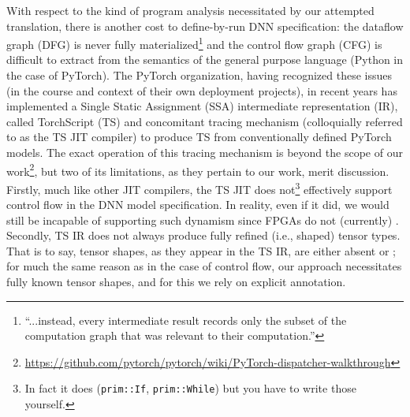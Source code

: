 With respect to the kind of program analysis necessitated by our attempted translation, there is another cost to define-by-run DNN specification: the dataflow graph (DFG) is never fully materialized\footnote{``...instead, every intermediate result records only the subset of the computation graph that was relevant to their computation.''\cite{paszke2017automatic}} and the control flow graph (CFG) is difficult to extract from the semantics of the general purpose language (Python in the case of PyTorch).
The PyTorch organization, having recognized these issues (in the course and context of their own deployment projects), in recent years has implemented a Single Static Assignment (SSA) intermediate representation (IR), called TorchScript (TS) and concomitant tracing mechanism (colloquially referred to as the TS JIT compiler) to produce TS from conventionally defined PyTorch models.
The exact operation of this tracing mechanism is beyond the scope of our work\footnote{\url{https://github.com/pytorch/pytorch/wiki/PyTorch-dispatcher-walkthrough}}, but two of its limitations, as they pertain to our work, merit discussion.
Firstly, much like other JIT compilers, the TS JIT does not\footnote{In fact it does (\texttt{prim::If}, \texttt{prim::While}) but you have to write those yourself.} effectively support control flow in the DNN model specification.
In reality, even if it did, we would still be incapable of supporting such dynamism since FPGAs do not (currently) .
Secondly, TS IR does not always produce fully refined (i.e., shaped) tensor types.
That is to say, tensor shapes, as they appear in the TS IR, are either absent or ; for much the same reason as in the case of control flow, our approach necessitates fully known tensor shapes, and for this we rely on explicit annotation.

